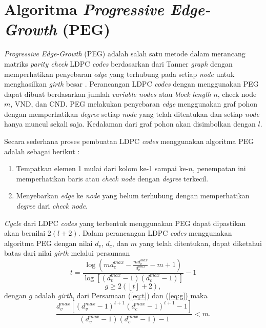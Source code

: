 \section{Algoritma \textit{Progressive Edge-Growth} (PEG)}

\textit{Progressive Edge-Growth} (PEG) adalah salah satu metode dalam merancang matriks \textit{parity check} LDPC \textit{codes} berdasarkan dari Tanner \textit{graph} dengan memperhatikan penyebaran \textit{edge} yang terhubung pada setiap \textit{node} untuk menghasilkan \textit{girth} besar \cite{PEG}. Perancangan LDPC \textit{codes} dengan menggunakan PEG dapat dibuat berdasarkan jumlah \textit{variable nodes} atau \textit{block length} $n$, check node $m$, VND, dan CND. PEG melakukan penyebaran \textit{edge} menggunakan graf pohon dengan memperhatikan \textit{degree} setiap \textit{node} yang telah ditentukan dan setiap \textit{node} hanya muncul sekali saja. Kedalaman dari graf pohon akan disimbolkan dengan $l$.

Secara sederhana proses pembuatan LDPC \textit{codes} menggunakan algoritma PEG adalah sebagai  berikut \cite{PEG}:
\begin{enumerate}
	\item Tempatkan elemen 1 mulai dari kolom ke-1 sampai ke-$n$, penempatan ini memperhatikan baris atau \textit{check node} dengan \textit{degree} terkecil.
	\item Menyebarkan \textit{edge} ke \textit{node} yang belum terhubung dengan memperhatikan \textit{degree} dari \textit{check node}.
\end{enumerate}
\textit{Cycle} dari LDPC \textit{codes} yang terbentuk menggunakan PEG dapat dipastikan akan bernilai $2(l+2)$.
Dalam perancangan LDPC \textit{codes} menggunakan algoritma PEG dengan nilai $d_v$, $d_c$, dan $m$ yang telah ditentukan, dapat diketahui batas dari nilai \textit{girth} melalui persamaan
\begin{equation}
t=\frac{\log\left ( md_c^{max}- \frac{md_c^{max}}{d_v^{max}} - m +1 \right )}{\log\left [ \left ( d_v^{max} -1  \right ) \left ( d_c^{max} -1  \right ) \right ]}-1
\label{eq:t}
\end{equation}
\begin{equation}
g \geq 2 \left (\left \lfloor t \right \rfloor +2 \right ),
\label{eq:g}
\end{equation}
dengan $g$ adalah \textit{girth}, dari Persamaan (\ref{eq:t}) dan (\ref{eq:g}) maka
\begin{equation}
\frac{d_v^{max}\left [  \left ( d_v^{max}-1 \right )^{t+1} \left ( d_c^{max}-1 \right )^{t+1} -1\right ]}{\left ( d_v^{max}-1 \right ) \left ( d_c^{max}-1 \right )-1}<m.
\end{equation}

